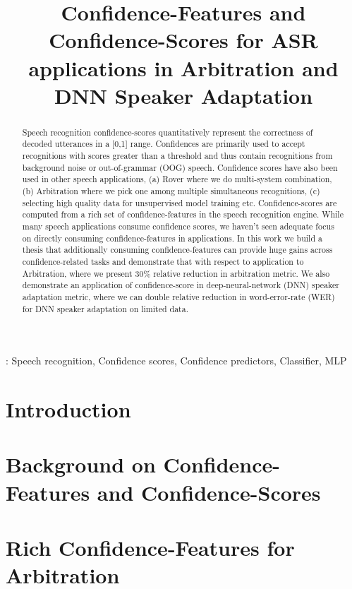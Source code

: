 \documentclass[a4paper]{article}
\title{Confidence-Features and Confidence-Scores for ASR applications in Arbitration and DNN Speaker Adaptation}
\begin{document}
\maketitle

\begin{abstract}
Speech recognition confidence-scores quantitatively represent the correctness of
decoded utterances in a [0,1] range. Confidences are primarily used to accept recognitions
with scores greater than a threshold and thus contain recognitions from background noise
or out-of-grammar (OOG) speech. Confidence scores have also been used in other speech applications, 
(a) Rover where we do multi-system combination, (b) Arbitration where we pick one among multiple 
simultaneous recognitions, (c) selecting high quality data for unsupervised model training etc. 
Confidence-scores are computed from a rich set of confidence-features in the speech recognition engine. 
While many speech applications consume confidence scores, we haven't seen adequate focus on directly 
consuming confidence-features in applications. In this work we build a thesis that additionally consuming confidence-features can provide huge gains across confidence-related tasks and demonstrate that with respect to application to Arbitration, where we present 30\% relative reduction in arbitration metric. We also demonstrate an application of confidence-score in deep-neural-network (DNN) speaker adaptation metric, where we can double relative reduction in word-error-rate (WER) for DNN speaker adaptation on limited data.
\end{abstract}
: Speech recognition, Confidence scores, Confidence predictors, Classifier, MLP

%
\section{Introduction}\label{Sec:Intro}


\section{Background on Confidence-Features and Confidence-Scores}\label{Sec:CC-Background}



\section{Rich Confidence-Features for Arbitration}\label{Sec:Arbitration}

\end{document}
